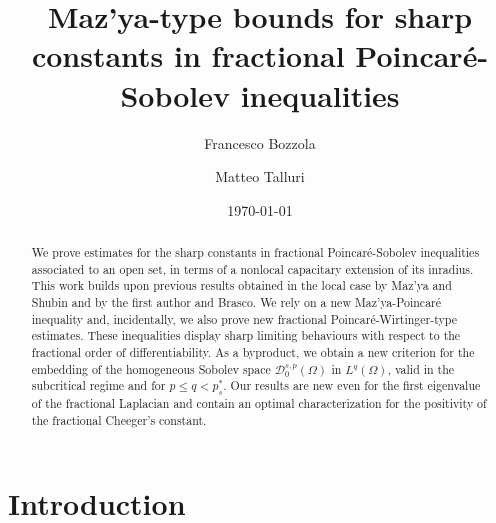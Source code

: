 \documentclass{amsart}
\author[Bozzola]{Francesco Bozzola}
\author[Talluri]{Matteo Talluri}
\date{\today}
\title[Maz'ya-type bounds]{Maz'ya-type bounds for sharp constants in fractional Poincar\'e-Sobolev inequalities}
\theoremstyle{definition}
\numberwithin{equation}{section}
\begin{document}
	
	\begin{abstract}
		We prove estimates for the sharp constants in fractional Poincar\'e-Sobolev inequalities associated to an open set, in terms of a nonlocal capacitary extension of its inradius. This work builds upon previous results obtained in the local case by Maz'ya and Shubin and by the first author and Brasco. We rely on a new Maz'ya-Poincar\'e inequality and, incidentally, we also prove new fractional Poincar\'e-Wirtinger-type estimates. These inequalities display sharp limiting behaviours with respect to the fractional order of differentiability. As a byproduct, we obtain a new criterion for the embedding of the homogeneous Sobolev space $\mathcal{D}^{s,p}_0(\Omega)$ in $L^q(\Omega)$, valid in the subcritical regime and for $p \le q < p^*_s$. Our results are new even for the first eigenvalue of the fractional Laplacian and contain an optimal characterization for the positivity of the fractional Cheeger's constant.
	\end{abstract}
	
	\maketitle
	
	\begin{center}
		\begin{minipage}{10cm}
			\small
			\tableofcontents
		\end{minipage}
	\end{center}
	
	\section{Introduction}
	
\end{document}
